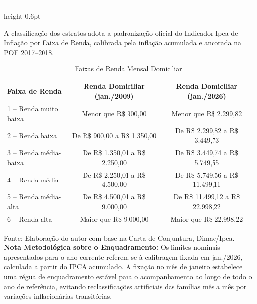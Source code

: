 \documentclass[10pt,a4paper]{article}
\begin{document}
	\vspace{0.02cm}
	{\color{rulecolor}\hrule height 0.6pt}
	\vspace{0.08cm}
	
	\vspace{0.06cm}
	
	{\small A classificação dos estratos adota a padronização oficial do Indicador Ipea de Inflação por Faixa de Renda, calibrada pela inflação acumulada e ancorada na POF 2017--2018.}
	
	\vspace{0.04cm}
	
	\begin{table}[htbp]
		\centering
		\caption{Faixas de Renda Mensal Domiciliar}
		\vspace{2pt}
		\footnotesize
		\begin{tabular*}{\textwidth}{@{\extracolsep{\fill}} l c c @{}}
			\toprule
			\textbf{Faixa de Renda} & \textbf{Renda Domiciliar (jan./2009)} & \textbf{Renda Domiciliar (jan./2026)} \\
			\midrule
			
			1 -- Renda muito baixa & Menor que R\$ 900,00 & Menor que R\$ 2.299,82 \\
			
			2 -- Renda baixa & De R\$ 900,00 a R\$ 1.350,00 & De R\$ 2.299,82 a R\$ 3.449,73 \\
			
			3 -- Renda média-baixa & De R\$ 1.350,01 a R\$ 2.250,00 & De R\$ 3.449,74 a R\$ 5.749,55 \\
			
			4 -- Renda média & De R\$ 2.250,01 a R\$ 4.500,00 & De R\$ 5.749,56 a R\$ 11.499,11 \\
			
			5 -- Renda média-alta & De R\$ 4.500,01 a R\$ 9.000,00 & De R\$ 11.499,12 a R\$ 22.998,22 \\
			
			6 -- Renda alta & Maior que R\$ 9.000,00 & Maior que R\$ 22.998,22 \\
			
			\bottomrule
		\end{tabular*}
		\vspace{2pt}
		\noindent\raggedright
		{\tiny \color{secondary} Fonte: Elaboração do autor com base na Carta de Conjuntura, Dimac/Ipea. \textbf{Nota Metodológica sobre o Enquadramento:} Os limites nominais apresentados para o ano corrente referem-se à calibragem fixada em jan./2026, calculada a partir do IPCA acumulado. A fixação no mês de janeiro estabelece uma régua de enquadramento estável para o acompanhamento ao longo de todo o ano de referência, evitando reclassificações artificiais das famílias mês a mês por variações inflacionárias transitórias.}
	\end{table}
	
\end{document}
